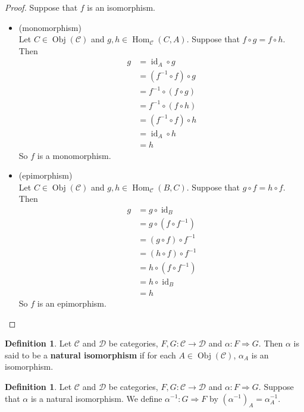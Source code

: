\documentclass{book}
\theoremstyle{definition}
\newtheorem{defn}[definition]{Definition}
\newcommand{\al}{\alpha}
\newcommand{\MC}{\mathcal{C}}
\newcommand{\MD}{\mathcal{D}}
\newcommand{\ld}[1]{\label{defn:#1}}
\DeclareMathOperator{\id}{id}
\DeclareMathOperator{\Obj}{Obj}
\DeclareMathOperator{\Hom}{Hom}
\DeclareMathOperator*{\0}{\mbf{0}}
\DeclareMathOperator*{\1}{\mbf{1}}
\begin{document}
	\begin{proof}
		Suppose that $f$ is an isomorphism. 
		\begin{itemize}
			\item (monomorphism) \\
			Let $C \in \Obj(\MC)$ and $g, h \in \Hom_{\MC}(C, A)$. Suppose that $f \circ g = f \circ h$. Then
			\begin{align*}
				g 
				& = \id_A \circ g \\
				& = (f^{-1} \circ f) \circ g \\
				& = f^{-1} \circ (f \circ g) \\
				& = f^{-1} \circ (f \circ h) \\
				& = (f^{-1} \circ f) \circ h \\
				& = \id_A \circ h \\
				& = h
			\end{align*}
			So $f$ is a monomorphism.
			\item  (epimorphism) \\
			Let $C \in \Obj(\MC)$ and $g, h \in \Hom_{\MC}(B, C)$. Suppose that $ g \circ f = h \circ f$. Then
			\begin{align*}
				g 
				& = g \circ \id_B \\
				& = g \circ (f \circ f^{-1}) \\
				& = (g \circ f) \circ f^{-1} \\
				& = (h \circ f) \circ f^{-1} \\
				& = h \circ (f \circ f^{-1}) \\
				& = h \circ \id_B \\
				& = h
			\end{align*}
			So $f$ is an epimorphism.
		\end{itemize}
	\end{proof}
	
	\begin{defn} \ld{15011.1}
		Let $\MC$ and $\MD$ be categories, $F,G: \MC \rightarrow \MD$ and $\al : F \Rightarrow G$. Then $\al$ is said to be a \textbf{natural isomorphism} if for each $A \in \Obj(\MC)$, $\al_A$ is an isomorphism.
	\end{defn}

	\begin{defn} \ld{15011.2}
		Let $\MC$ and $\MD$ be categories, $F,G: \MC \rightarrow \MD$ and $\al : F \Rightarrow G$. Suppose that $\al$ is a natural isomorphism. We define $\al^{-1}: G \Rightarrow F$ by $(\al^{-1})_A = \al_A^{-1}$. 
	\end{defn}
\end{document}
